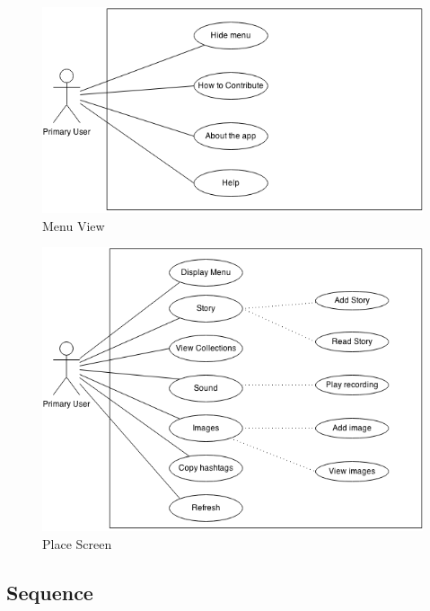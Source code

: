 \begin{figure}[!h]
\begin{center}
\includegraphics[scale=0.6]{mens.png}
\caption{Menu View}
\end{center}
\end{figure}

\begin{figure}[!h]
\begin{center}
\includegraphics[scale=0.6]{ps2.png}
\caption{Place Screen}
\end{center}
\end{figure}

\clearpage

\subsection{Sequence}

